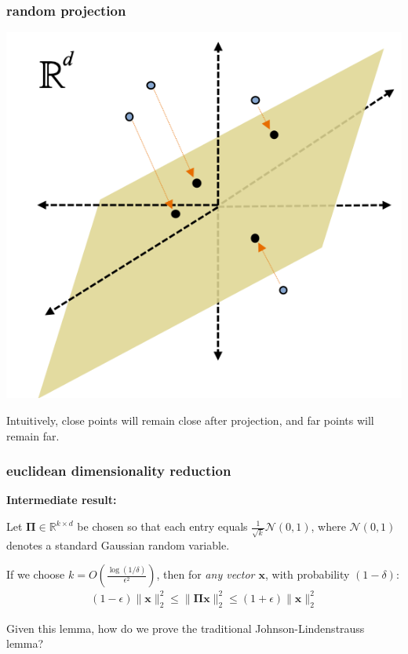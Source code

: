 \documentclass[compress,handout]{beamer}
\newcommand{\bs}[1]{\boldsymbol{#1}}
\newcommand{\bv}[1]{\mathbf{#1}}
\newcommand{\R}{\mathbb{R}}
\begin{document}
\begin{frame}
	\frametitle{random projection}
	\begin{center}
		\includegraphics[width=.6\textwidth]{random_projection.png}
	\end{center}
	Intuitively, close points will remain close after projection, and far points will remain far. 
\end{frame}

\begin{frame}
	\frametitle{euclidean dimensionality reduction}
	\textbf{Intermediate result:}
	\begin{lemma}
	Let $\bs{\Pi} \in \R^{k\times d}$ be chosen so that each entry equals $\frac{1}{\sqrt{k}}  \mathcal{N}(0,1)$, where $\mathcal{N}(0,1)$ denotes a standard Gaussian random variable. 
	
	If we choose $k = O\left(\frac{\log(1/\delta)}{\epsilon^2}\right)$, then for \emph{any vector $\bv{x}$}, with probability $(1-\delta)$:
	\begin{align*}
		(1-\epsilon)\|\bv{x}\|_2^2 \leq \|\bs{\Pi}\bv{x}\|_2^2 \leq (1+\epsilon) \|\bv{x}\|_2^2
	\end{align*}
	\end{lemma}

\begin{center}\alert{
	Given this lemma, how do we prove the traditional Johnson-Lindenstrauss lemma?}
\end{center}
\end{frame}
\end{document}
